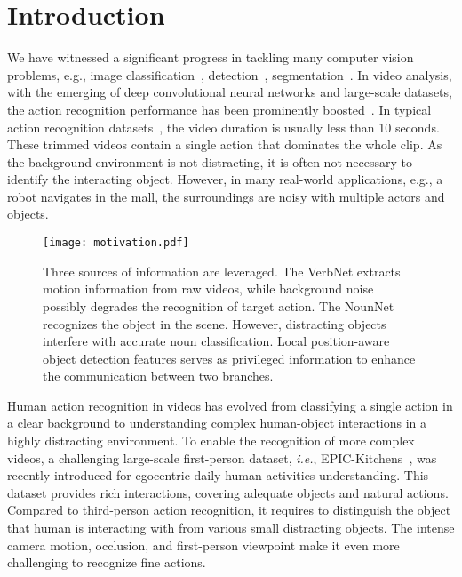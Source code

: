 \documentclass[letterpaper]{article} \usepackage{aaai20}  \usepackage{times}  \usepackage{helvet} \usepackage{courier}  \usepackage[hyphens]{url}  \usepackage{graphicx} \urlstyle{rm} \def\UrlFont{\rm}  \usepackage{graphicx}  \frenchspacing  \setlength{\pdfpagewidth}{8.5in}  \setlength{\pdfpageheight}{11in}  \usepackage{amsfonts,amssymb}
\begin{document}
\section{Introduction}
We have witnessed a significant progress in tackling many computer vision problems, e.g., image classification~\cite{krizhevsky2012imagenet,he2016deep,huang2017densely}, detection~\cite{girshick2014rich,girshick2015fast,Ren2015FasterRT,He2017MaskR}, segmentation~\cite{long2015fully,chen2017deeplab,He2017MaskR}. In video analysis, with the emerging of deep convolutional neural networks and large-scale datasets, the action recognition performance has been prominently boosted~\cite{simonyan2014two,tran2015learning,zhu2018hidden,TSN2016ECCV,xie2018rethinking,wu2019DAM}. In typical action recognition datasets~\cite{Carreira2017QuoVA,goyal2017something}, the video duration is usually less than 10 seconds.
These trimmed videos contain a single action that dominates the whole clip. As the background environment is not distracting, it is often not necessary to identify the interacting object.
However, in many real-world applications, e.g., a robot navigates in the mall, the surroundings are noisy with multiple actors and objects.

\begin{figure}[t]
\center
\texttt{[image: motivation.pdf]}
\caption{
Three sources of information are leveraged. The VerbNet extracts motion information from raw videos, while background noise possibly degrades the recognition of target action.
The NounNet recognizes the object in the scene. However, distracting objects interfere with accurate noun classification.
Local position-aware object detection features serves as privileged information to enhance the communication between two branches. 
}
\label{fig:motivation}  
\end{figure}

Human action recognition in videos has evolved from classifying a single action in a clear background to understanding complex human-object interactions in a highly distracting environment.
To enable the recognition of more complex videos, a challenging large-scale first-person dataset, \textit{i.e.}, EPIC-Kitchens~\cite{Damen2018ScalingEV}, was recently introduced for egocentric daily human activities understanding.
This dataset provides rich interactions, covering adequate objects and natural actions.
Compared to third-person action recognition, it requires to distinguish the object that human is interacting with from
various small distracting objects.
The intense camera motion, occlusion, and first-person viewpoint make it even more challenging to recognize fine actions.
\end{document}
